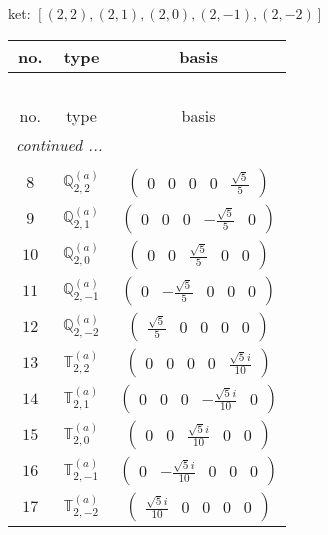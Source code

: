 \documentclass[fleqn,8pt,landscape]{jsarticle}
\begin{document}
\noindent
ket: $[(2,2),(2,1),(2,0),(2,-1),(2,-2)]$
\begin{center}
\renewcommand{\arraystretch}{1.6}
\begin{longtable}{ccc}
 \hline \hline
no. & type & basis \\ \hline \endfirsthead

\multicolumn{2}{l}{\tablename\ \thetable{}} \\
 \hline \hline
no. & type & basis \\ \hline \endhead

 \hline \hline
\multicolumn{2}{r}{\footnotesize\it continued ...} \\ \endfoot

 \hline \hline
\multicolumn{2}{r}{} \\ \endlastfoot

$ 8 $ & $ \mathbb{Q}_{2,2}^{(a)} $ & $ \begin{pmatrix} 0 & 0 & 0 & 0 & \frac{\sqrt{5}}{5} \end{pmatrix} $ \\ \hline
$ 9 $ & $ \mathbb{Q}_{2,1}^{(a)} $ & $ \begin{pmatrix} 0 & 0 & 0 & - \frac{\sqrt{5}}{5} & 0 \end{pmatrix} $ \\ \hline
$ 10 $ & $ \mathbb{Q}_{2,0}^{(a)} $ & $ \begin{pmatrix} 0 & 0 & \frac{\sqrt{5}}{5} & 0 & 0 \end{pmatrix} $ \\ \hline
$ 11 $ & $ \mathbb{Q}_{2,-1}^{(a)} $ & $ \begin{pmatrix} 0 & - \frac{\sqrt{5}}{5} & 0 & 0 & 0 \end{pmatrix} $ \\ \hline
$ 12 $ & $ \mathbb{Q}_{2,-2}^{(a)} $ & $ \begin{pmatrix} \frac{\sqrt{5}}{5} & 0 & 0 & 0 & 0 \end{pmatrix} $ \\ \hline
$ 13 $ & $ \mathbb{T}_{2,2}^{(a)} $ & $ \begin{pmatrix} 0 & 0 & 0 & 0 & \frac{\sqrt{5} i}{10} \end{pmatrix} $ \\ \hline
$ 14 $ & $ \mathbb{T}_{2,1}^{(a)} $ & $ \begin{pmatrix} 0 & 0 & 0 & - \frac{\sqrt{5} i}{10} & 0 \end{pmatrix} $ \\ \hline
$ 15 $ & $ \mathbb{T}_{2,0}^{(a)} $ & $ \begin{pmatrix} 0 & 0 & \frac{\sqrt{5} i}{10} & 0 & 0 \end{pmatrix} $ \\ \hline
$ 16 $ & $ \mathbb{T}_{2,-1}^{(a)} $ & $ \begin{pmatrix} 0 & - \frac{\sqrt{5} i}{10} & 0 & 0 & 0 \end{pmatrix} $ \\ \hline
$ 17 $ & $ \mathbb{T}_{2,-2}^{(a)} $ & $ \begin{pmatrix} \frac{\sqrt{5} i}{10} & 0 & 0 & 0 & 0 \end{pmatrix} $ \\
\end{longtable}
\end{center}
\end{document}
